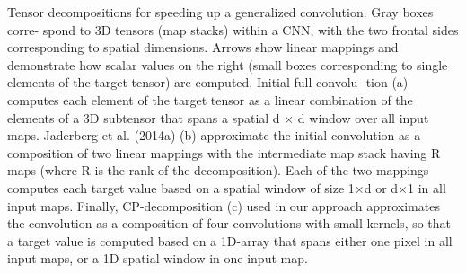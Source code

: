 Tensor decompositions for speeding up a generalized convolution. Gray boxes corre-
spond to 3D tensors (map stacks) within a CNN, with the two frontal sides corresponding to spatial
dimensions. Arrows show linear mappings and demonstrate how scalar values on the right (small
boxes corresponding to single elements of the target tensor) are computed. Initial full convolu-
tion (a) computes each element of the target tensor as a linear combination of the elements of a
3D subtensor that spans a spatial d × d window over all input maps. Jaderberg et al. (2014a) (b)
approximate the initial convolution as a composition of two linear mappings with the intermediate
map stack having R maps (where R is the rank of the decomposition). Each of the two mappings
computes each target value based on a spatial window of size 1×d or d×1 in all input maps. Finally,
CP-decomposition (c) used in our approach approximates the convolution as a composition of four
convolutions with small kernels, so that a target value is computed based on a 1D-array that spans
either one pixel in all input maps, or a 1D spatial window in one input map.
\\


